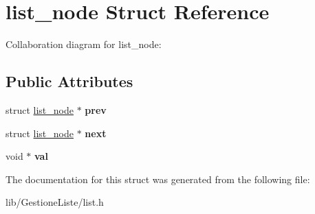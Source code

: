 \hypertarget{structlist__node}{}\section{list\+\_\+node Struct Reference}
\label{structlist__node}


Collaboration diagram for list\+\_\+node\+:
\subsection*{Public Attributes}
\begin{DoxyCompactItemize}
\item 
\mbox{\label{structlist__node_a30baba3b27442cbca9694076003ed65e}} 
struct \hyperlink{structlist__node}{list\+\_\+node} $\ast$ {\bfseries prev}
\item 
\mbox{\label{structlist__node_a0b99ca890dbfe832a8475f4bbd72338c}} 
struct \hyperlink{structlist__node}{list\+\_\+node} $\ast$ {\bfseries next}
\item 
\mbox{\label{structlist__node_a129de89b4c110fa54377ef16ab128ce0}} 
void $\ast$ {\bfseries val}
\end{DoxyCompactItemize}


The documentation for this struct was generated from the following file\+:\begin{DoxyCompactItemize}
\item 
lib/\+Gestione\+Liste/list.\+h\end{DoxyCompactItemize}
